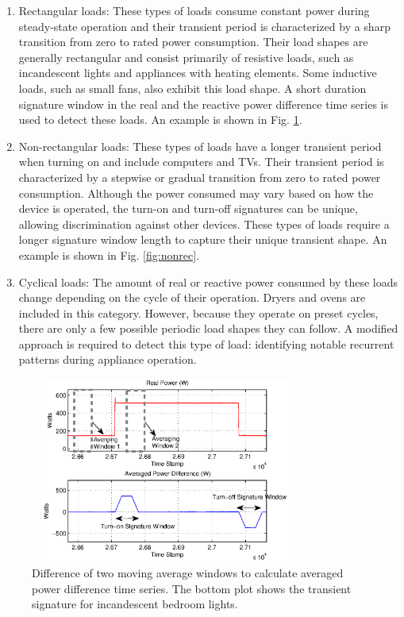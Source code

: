 \documentclass[conference]{IEEEtran}
\begin{document}
\begin{enumerate}
\item{Rectangular loads:} These types of loads consume constant power during steady-state operation and their transient period is characterized by a sharp transition from zero to rated power consumption.  Their load shapes are generally rectangular and consist primarily of resistive loads, such as incandescent lights and appliances with heating elements.  Some inductive loads, such as small fans, also exhibit this load shape.  A short duration signature window in the real and the reactive power difference time series is used to detect these loads.  An example is shown in Fig. \ref{fig:maw}.
\newline
\item{Non-rectangular loads:} These types of loads have a longer transient period when turning on and include computers and TVs.  Their transient period is characterized by a stepwise or gradual transition from zero to rated power consumption.  Although the power consumed may vary based on how the device is operated, the turn-on and turn-off signatures can be unique, allowing discrimination against other devices.  These types of loads require a longer signature window length to capture their unique transient shape.  An example is shown in Fig. \ref{fig:nonrec}.
\newline
\item{Cyclical loads:} The amount of real or reactive power consumed by these loads change depending on the cycle of their operation.  Dryers and ovens are included in this category.   However, because they operate on preset cycles, there are only a few possible periodic load shapes they can follow.  A modified approach is required to detect this type of load: identifying notable recurrent patterns during appliance operation.
\end{enumerate}

\begin{figure}[!t]
	\centering
	\includegraphics[height = 2.4in,width=3.5in]{fig/maw2.eps}
	\caption{Difference of two moving average windows to calculate averaged power difference time series.  The bottom plot shows the transient signature for incandescent bedroom lights.}
	\label{fig:maw}
\end{figure}
\end{document}
